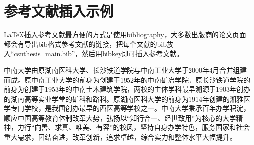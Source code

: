 \section{参考文献插入示例}

LaTeX\cite{lamport1994latex}插入参考文献最方便的方式是使用bibliography\cite{pritchard1969statistical}，大多数出版商的论文页面\cite{lamport1994latex,pritchard1969statistical}都会有导出bib格式参考文献的链接，把每个文献的bib放入``csuthesis\_main.bib''，然后用bibkey即可插入参考文献。

中南大学由原湖南医科大学、长沙铁道学院与中南工业大学于2000年4月合并组建而成。原中南工业大学的前身为创建于1952年的中南矿冶学院，原长沙铁道学院的前身为创建于1953年的中南土木建筑学院，两校的主体学科最早溯源于1903年创办的湖南高等实业学堂的矿科和路科。原湖南医科大学的前身为1914年创建的湘雅医学专门学校，是我国创办最早的西医高等学校之一。中南大学秉承百年办学积淀，顺应中国高等教育体制改革大势，弘扬以“知行合一、经世致用”为核心的大学精神，力行“向善、求真、唯美、有容”的校风，坚持自身办学特色，服务国家和社会重大需求，团结奋进，改革创新，追求卓越，综合实力和整体水平大幅提升。

\newpage



